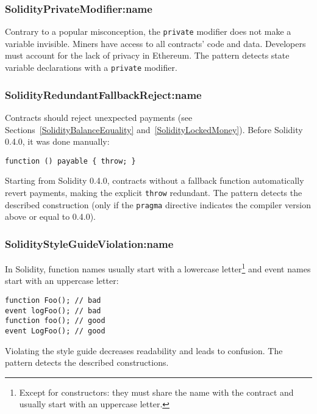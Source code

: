\subsubsection{\usevalue SolidityPrivateModifier:name } \label{SolidityPrivateModifier}

Contrary to a popular misconception, the \texttt{private} modifier does not make a variable invisible.
Miners have access to all contracts' code and data.
Developers must account for the lack of privacy in Ethereum.
The pattern detects state variable declarations with a \texttt{private} modifier.

\subsubsection{\usevalue SolidityRedundantFallbackReject:name } \label{SolidityRedundantFallbackReject}

Contracts should reject unexpected payments (see Sections~\ref{SolidityBalanceEquality} and~\ref{SolidityLockedMoney}).
Before Solidity 0.4.0, it was done manually:
\begin{lstlisting}[language=Solidity]
function () payable { throw; }
\end{lstlisting}
Starting from Solidity 0.4.0, contracts without a fallback function automatically revert payments, making the explicit \texttt{throw} redundant.
The pattern detects the described construction (only if the \texttt{pragma} directive indicates the compiler version above or equal to 0.4.0).


\subsubsection{\usevalue SolidityStyleGuideViolation:name } \label{SolidityStyleGuideViolation}

In Solidity, function names usually start with a lowercase letter\footnote{Except for constructors: they must share the name with the contract and usually start with an uppercase letter.} and event names start with an uppercase letter:
\begin{lstlisting}[language=Solidity]
function Foo(); // bad
event logFoo(); // bad
function foo(); // good
event LogFoo(); // good
\end{lstlisting}
Violating the style guide decreases readability and leads to confusion.
The pattern detects the described constructions.

